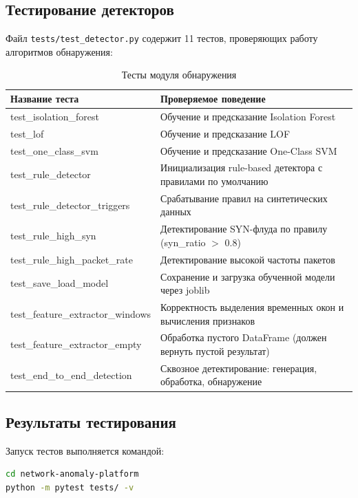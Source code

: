 \subsection{Тестирование детекторов}

Файл \texttt{tests/test\_detector.py} содержит 11 тестов, проверяющих работу алгоритмов обнаружения:

\begin{table}[H]
\centering
\caption{Тесты модуля обнаружения}
\label{tab:tests_detector}
\begin{tabular}{p{5cm}p{9.5cm}}
\toprule
\textbf{Название теста} & \textbf{Проверяемое поведение} \\
\midrule
test\_isolation\_forest & Обучение и предсказание Isolation Forest \\
test\_lof & Обучение и предсказание LOF \\
test\_one\_class\_svm & Обучение и предсказание One-Class SVM \\
test\_rule\_detector & Инициализация rule-based детектора с правилами по умолчанию \\
test\_rule\_detector\_triggers & Срабатывание правил на синтетических данных \\
test\_rule\_high\_syn & Детектирование SYN-флуда по правилу (syn\_ratio $>$ 0.8) \\
test\_rule\_high\_packet\_rate & Детектирование высокой частоты пакетов \\
test\_save\_load\_model & Сохранение и загрузка обученной модели через joblib \\
test\_feature\_extractor\_windows & Корректность выделения временных окон и вычисления признаков \\
test\_feature\_extractor\_empty & Обработка пустого DataFrame (должен вернуть пустой результат) \\
test\_end\_to\_end\_detection & Сквозное детектирование: генерация, обработка, обнаружение \\
\bottomrule
\end{tabular}
\end{table}

\subsection{Результаты тестирования}

Запуск тестов выполняется командой:

\begin{lstlisting}[caption=Запуск тестов, label=lst:run_tests, language=bash]
cd network-anomaly-platform
python -m pytest tests/ -v
\end{lstlisting}


